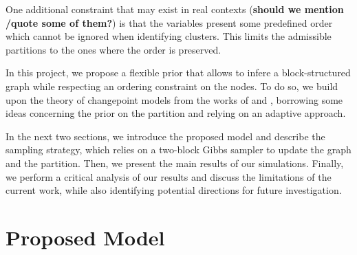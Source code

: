 One additional constraint that may exist in real contexts (\textbf{should we mention /quote some of them?}) is that the variables present some predefined order which cannot be ignored when identifying clusters. This limits the admissible partitions to the ones where the order is preserved.

In this project, we propose a flexible prior that allows to infere a block-structured graph while respecting an ordering constraint on the nodes. To do so, we build upon the theory of changepoint models from the works of \parencite{bensonAdaptiveMCMCMultiple2018} and \parencite{martinezNonparametricChangePoint2014}, borrowing some ideas concerning the prior on the partition and relying on an adaptive approach. 

In the next two sections, we introduce the proposed model and describe the sampling strategy, which relies on a two-block Gibbs sampler to update the graph and the partition. Then, we present the main results of our simulations. Finally, we perform a critical analysis of our results and discuss the limitations of the current work, while also identifying potential directions for future investigation.


\section{Proposed Model}


